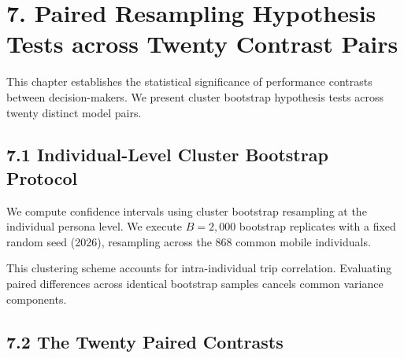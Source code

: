 \section{7. Paired Resampling Hypothesis Tests across Twenty Contrast Pairs}

This chapter establishes the statistical significance of performance contrasts between decision-makers. We present cluster bootstrap hypothesis tests across twenty distinct model pairs.

\subsection{7.1 Individual-Level Cluster Bootstrap Protocol}

We compute confidence intervals using cluster bootstrap resampling at the individual persona level. We execute $B = 2{,}000$ bootstrap replicates with a fixed random seed (2026), resampling across the 868 common mobile individuals.

This clustering scheme accounts for intra-individual trip correlation. Evaluating paired differences across identical bootstrap samples cancels common variance components.

\subsection{7.2 The Twenty Paired Contrasts}

